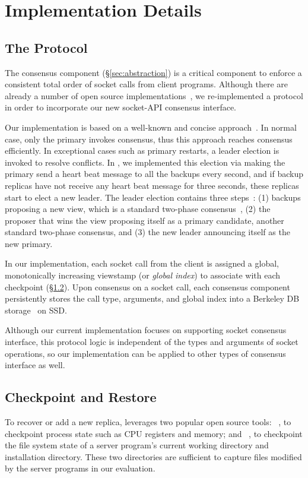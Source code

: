 \section{Implementation Details} \label{sec:impl}

\subsection{The \paxos Protocol} \label{sec:paxos}
The \paxos consensus component (\S\ref{sec:abstraction}) is a critical 
component to enforce a consistent total order of socket calls from client 
programs. Although there are already a number of open source \paxos 
implementations~\cite{concoord, zookeeper, libpaxos}, we re-implemented a \paxos 
protocol in order to incorporate our new socket-API consensus interface.

Our \paxos implementation is based on a well-known and concise 
approach~\cite{paxos:practical}. In normal case, only the primary invokes 
consensus, thus this approach reaches consensus efficiently. In exceptional 
cases such as primary restarts, a \paxos leader election 
is invoked to resolve conflicts. In \xxx, we implemented this election via 
making the primary send a heart beat message to all the backups every 
second, and if backup replicas have not receive any heart beat message for 
three seconds, these replicas start to elect a new leader. The 
leader election contains three steps~\cite{paxos:practical}: (1) backups 
proposing a new view, which is a standard \paxos two-phase 
consensus~\cite{paxos:simple}, (2) the proposer that wins the view proposing 
itself as a primary candidate, another standard \paxos two-phase consensus, and 
(3) the new leader announcing itself as the new primary.

In our implementation, each socket call from 
the client is assigned a global, monotonically increasing viewstamp (or 
\emph{global index}) to associate with each checkpoint 
(\S\ref{sec:checkpoint}). Upon consensus on a socket call, each consensus 
component persistently stores the call type, arguments, and global index into a 
Berkeley DB storage~\cite{berkeleydb} on SSD.

Although our current \paxos implementation focuses on supporting socket 
consensus interface, this \paxos protocol logic is independent of the types and 
arguments of socket operations, so our \paxos implementation can be applied 
to other types of consensus interface as well.

\subsection{Checkpoint and Restore} \label{sec:checkpoint}
To recover or add a new replica, \xxx leverages two popular open source 
tools: \criu~\cite{criu}, to checkpoint process state such as CPU registers and 
memory; and \lxc~\cite{lxc}, to checkpoint the file system state of a server 
program's current working directory and installation directory. These two 
directories are sufficient to capture files modified by the server programs in 
our evaluation.

